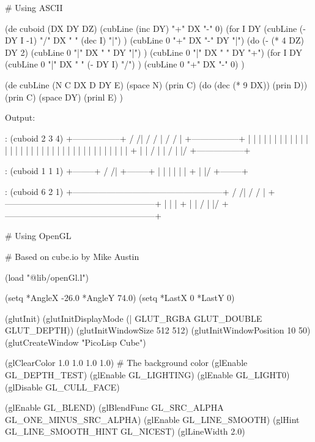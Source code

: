 \begin{wideverbatim}

# Using ASCII

(de cuboid (DX DY DZ)
   (cubLine (inc DY) "+" DX "-" 0)
   (for I DY
      (cubLine (- DY I -1) "/" DX " " (dec I) "|") )
   (cubLine 0 "+" DX "-" DY "|")
   (do (- (* 4 DZ) DY 2)
      (cubLine 0 "|" DX " " DY "|") )
   (cubLine 0 "|" DX " " DY "+")
   (for I DY
      (cubLine 0 "|" DX " " (- DY I) "/") )
   (cubLine 0 "+" DX "-" 0) )

(de cubLine (N C DX D DY E)
   (space N)
   (prin C)
   (do (dec (* 9 DX)) (prin D))
   (prin C)
   (space DY)
   (prinl E) )

\end{wideverbatim}

\begin{wideverbatim}

Output:

: (cuboid 2 3 4)
    +-----------------+
   /                 /|
  /                 / |
 /                 /  |
+-----------------+   |
|                 |   |
|                 |   |
|                 |   |
|                 |   |
|                 |   |
|                 |   |
|                 |   |
|                 |   |
|                 |   |
|                 |   |
|                 |   |
|                 |   +
|                 |  /
|                 | /
|                 |/
+-----------------+

: (cuboid 1 1 1)
  +--------+
 /        /|
+--------+ |
|        | |
|        | +
|        |/
+--------+

: (cuboid 6 2 1)
   +-----------------------------------------------------+
  /                                                     /|
 /                                                     / |
+-----------------------------------------------------+  |
|                                                     |  +
|                                                     | /
|                                                     |/
+-----------------------------------------------------+

\end{wideverbatim}

\begin{wideverbatim}


# Using OpenGL

# Based on cube.io by Mike Austin

(load "@lib/openGl.l")

(setq *AngleX -26.0 *AngleY 74.0)
(setq *LastX 0 *LastY 0)

(glutInit)
(glutInitDisplayMode (| GLUT_RGBA GLUT_DOUBLE GLUT_DEPTH))
(glutInitWindowSize 512 512)
(glutInitWindowPosition 10 50)
(glutCreateWindow "PicoLisp Cube")

(glClearColor 1.0 1.0 1.0 1.0)	# The background color
(glEnable GL_DEPTH_TEST)
(glEnable GL_LIGHTING)
(glEnable GL_LIGHT0)
(glDisable GL_CULL_FACE)

(glEnable GL_BLEND)
(glBlendFunc GL_SRC_ALPHA GL_ONE_MINUS_SRC_ALPHA)
(glEnable GL_LINE_SMOOTH)
(glHint GL_LINE_SMOOTH_HINT GL_NICEST)
(glLineWidth 2.0)

\end{wideverbatim}

